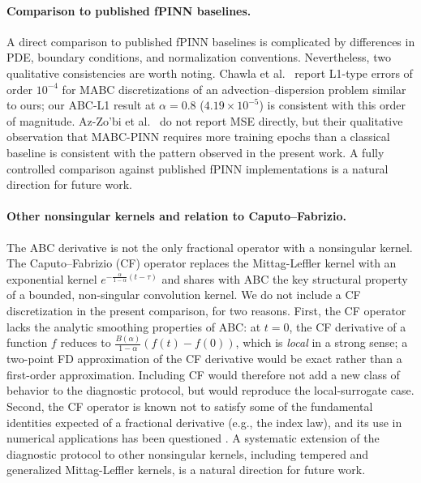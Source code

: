 \documentclass[11pt]{article}
\begin{document}
\paragraph{Comparison to published fPINN baselines.}
A direct comparison to published fPINN baselines is complicated by
differences in PDE, boundary conditions, and normalization conventions.
Nevertheless, two qualitative consistencies are worth noting.
Chawla et al.~\cite{Chawla2022} report L1-type errors of order
\(10^{-4}\) for MABC discretizations of an advection--dispersion problem
similar to ours; our ABC-L1 result at \(\alpha=0.8\)
(\(4.19\times 10^{-5}\)) is consistent with this order of magnitude.
Az-Zo'bi et al.~\cite{AzZobi2025} do not report MSE directly, but their
qualitative observation that MABC-PINN requires more training epochs
than a classical baseline is consistent with the pattern observed in
the present work. A fully controlled comparison against published
fPINN implementations is a natural direction for future work.

\paragraph{Other nonsingular kernels and relation to Caputo--Fabrizio.}
The ABC derivative is not the only fractional operator with a nonsingular kernel. The Caputo--Fabrizio (CF) operator \cite{CaputoFabrizio2015} replaces the Mittag-Leffler kernel with an exponential kernel \(e^{-\frac{\alpha}{1-\alpha}(t-\tau)}\) and shares with ABC the key structural property of a bounded, non-singular convolution kernel. We do not include a CF discretization in the present comparison, for two reasons. First, the CF operator lacks the analytic smoothing properties of ABC: at \(t=0\), the CF derivative of a function \(f\) reduces to \(\frac{B(\alpha)}{1-\alpha}(f(t)-f(0))\), which is \emph{local} in a strong sense; a two-point FD approximation of the CF derivative would be exact rather than a first-order approximation. Including CF would therefore not add a new class of behavior to the diagnostic protocol, but would reproduce the local-surrogate case. Second, the CF operator is known not to satisfy some of the fundamental identities expected of a fractional derivative (e.g., the index law), and its use in numerical applications has been questioned \cite{Diethelm2020}. A systematic extension of the diagnostic protocol to other nonsingular kernels, including tempered and generalized Mittag-Leffler kernels, is a natural direction for future work.
\end{document}
